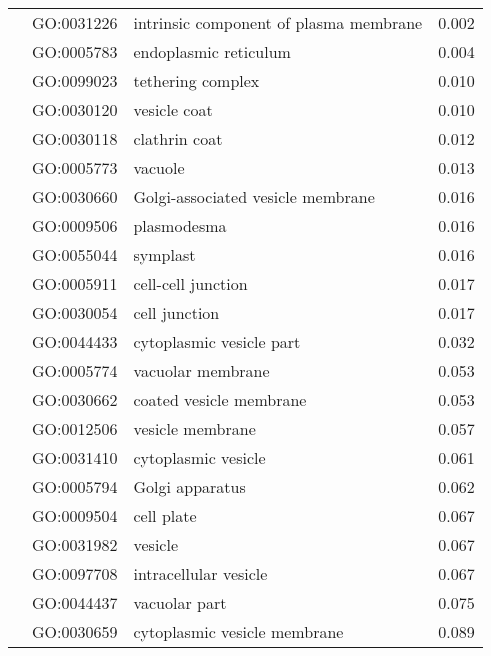 \begin{longtable}{lllr}
   & GO:0031226 &       intrinsic component of plasma membrane &         0.002 \\
   & GO:0005783 &                        endoplasmic reticulum &         0.004 \\
   & GO:0099023 &                            tethering complex &         0.010 \\
   & GO:0030120 &                                 vesicle coat &         0.010 \\
   & GO:0030118 &                                clathrin coat &         0.012 \\
   & GO:0005773 &                                      vacuole &         0.013 \\
   & GO:0030660 &            Golgi-associated vesicle membrane &         0.016 \\
   & GO:0009506 &                                  plasmodesma &         0.016 \\
   & GO:0055044 &                                     symplast &         0.016 \\
   & GO:0005911 &                           cell-cell junction &         0.017 \\
   & GO:0030054 &                                cell junction &         0.017 \\
   & GO:0044433 &                     cytoplasmic vesicle part &         0.032 \\
   & GO:0005774 &                            vacuolar membrane &         0.053 \\
   & GO:0030662 &                      coated vesicle membrane &         0.053 \\
   & GO:0012506 &                             vesicle membrane &         0.057 \\
   & GO:0031410 &                          cytoplasmic vesicle &         0.061 \\
   & GO:0005794 &                              Golgi apparatus &         0.062 \\
   & GO:0009504 &                                   cell plate &         0.067 \\
   & GO:0031982 &                                      vesicle &         0.067 \\
   & GO:0097708 &                        intracellular vesicle &         0.067 \\
   & GO:0044437 &                                vacuolar part &         0.075 \\
   & GO:0030659 &                 cytoplasmic vesicle membrane &         0.089 \\

\end{longtable}

